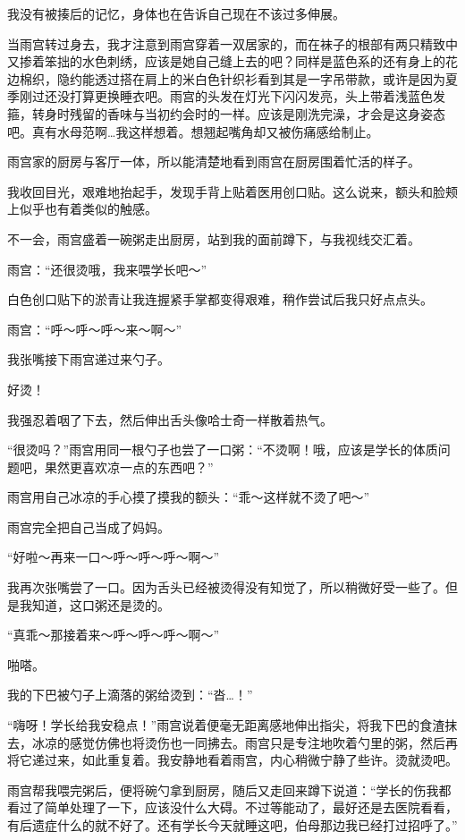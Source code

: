 我没有被揍后的记忆，身体也在告诉自己现在不该过多伸展。

当雨宫转过身去，我才注意到雨宫穿着一双居家的，而在袜子的根部有两只精致中又掺着笨拙的水色刺绣，应该是她自己缝上去的吧？同样是蓝色系的还有身上的花边棉织，隐约能透过搭在肩上的米白色针织衫看到其是一字吊带款，或许是因为夏季刚过还没打算更换睡衣吧。雨宫的头发在灯光下闪闪发亮，头上带着浅蓝色发箍，转身时残留的香味与当初约会时的一样。应该是刚洗完澡，才会是这身姿态吧。真有水母范啊…我这样想着。想翘起嘴角却又被伤痛感给制止。

雨宫家的厨房与客厅一体，所以能清楚地看到雨宫在厨房围着忙活的样子。

我收回目光，艰难地抬起手，发现手背上贴着医用创口贴。这么说来，额头和脸颊上似乎也有着类似的触感。

不一会，雨宫盛着一碗粥走出厨房，站到我的面前蹲下，与我视线交汇着。

雨宫：“还很烫哦，我来喂学长吧～”

白色创口贴下的淤青让我连握紧手掌都变得艰难，稍作尝试后我只好点点头。

雨宫：“呼～呼～呼～来～啊～”

我张嘴接下雨宫递过来勺子。

好烫！

我强忍着咽了下去，然后伸出舌头像哈士奇一样散着热气。

“很烫吗？”雨宫用同一根勺子也尝了一口粥：“不烫啊！哦，应该是学长的体质问题吧，果然更喜欢凉一点的东西吧？”

雨宫用自己冰凉的手心摸了摸我的额头：“乖～这样就不烫了吧～”

雨宫完全把自己当成了妈妈。

“好啦～再来一口～呼～呼～呼～啊～”

我再次张嘴尝了一口。因为舌头已经被烫得没有知觉了，所以稍微好受一些了。但是我知道，这口粥还是烫的。

“真乖～那接着来～呼～呼～呼～啊～”

啪嗒。

我的下巴被勺子上滴落的粥给烫到：“沓…！”

“嗨呀！学长给我安稳点！”雨宫说着便毫无距离感地伸出指尖，将我下巴的食渣抹去，冰凉的感觉仿佛也将烫伤也一同拂去。雨宫只是专注地吹着勺里的粥，然后再将它递过来，如此重复着。我安静地看着雨宫，内心稍微宁静了些许。烫就烫吧。

雨宫帮我喂完粥后，便将碗勺拿到厨房，随后又走回来蹲下说道：“学长的伤我都看过了简单处理了一下，应该没什么大碍。不过等能动了，最好还是去医院看看，有后遗症什么的就不好了。还有学长今天就睡这吧，伯母那边我已经打过招呼了。”

